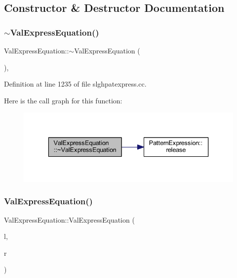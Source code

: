 \subsection{Constructor \& Destructor Documentation}
\mbox{\label{class_val_express_equation_ac594d3c5d3a66bae5b532e1f28219c70}} 
\subsubsection{\texorpdfstring{$\sim$ValExpressEquation()}{~ValExpressEquation()}}
{\footnotesize\ttfamily Val\+Express\+Equation\+::$\sim$\+Val\+Express\+Equation (\begin{DoxyParamCaption}\item[{void}]{ }\end{DoxyParamCaption})\hspace{0.3cm}{\ttfamily [protected]}, {\ttfamily [virtual]}}



Definition at line 1235 of file slghpatexpress.\+cc.

Here is the call graph for this function\+:
\nopagebreak
\begin{figure}[H]
\begin{center}
\leavevmode
\includegraphics[width=336pt]{class_val_express_equation_ac594d3c5d3a66bae5b532e1f28219c70_cgraph}
\end{center}
\end{figure}
\mbox{\label{class_val_express_equation_ae2ba4d8d94c4c9d19eb64fd51af0b0bd}} 
\subsubsection{\texorpdfstring{ValExpressEquation()}{ValExpressEquation()}}
{\footnotesize\ttfamily Val\+Express\+Equation\+::\+Val\+Express\+Equation (\begin{DoxyParamCaption}\item[{\mbox{\hyperlink{class_pattern_value}{Pattern\+Value}} $\ast$}]{l,  }\item[{\mbox{\hyperlink{class_pattern_expression}{Pattern\+Expression}} $\ast$}]{r }\end{DoxyParamCaption})}



